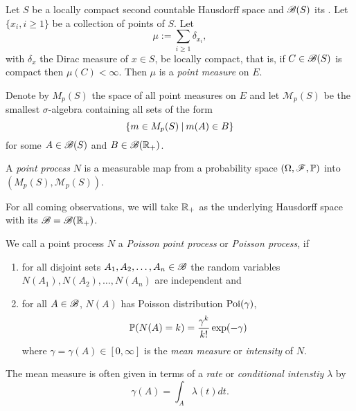 \begin{definition} \label{D: point process}
	Let $S$ be a locally compact second countable Hausdorff space
	and $\mathscr{B}(S)$ its \Bosi.
	Let $\{x_i, i \geq 1\}$ be a collection of points of $S$.
	Let
	\begin{equation}
		\mu := \sum_{i \geq 1} \delta_{x_i},
	\end{equation}
	with $\delta_x$ the Dirac measure of $x \in S$,
	be locally compact, that is, 
	if $C \in \mathscr{B}(S)$ is compact then $\mu(C) < \infty$.
	Then $\mu$ is a \emph{point measure} on $E$.
	
	Denote by $M_p(S)$ the space of all point measures on $E$
	and let $\mathscr{M}_p(S)$ be the smallest $\sigma$-algebra containing all sets of the form
	\begin{equation*}
		\{ m \in M_p(S) \: | \: m(A) \in B \}
	\end{equation*}
	for some $A \in \mathscr{B}(S)$ and $B \in \mathscr{B}(\mathbb{R}_+)$.
	
	A \emph{point process} $N$ is a measurable map from a probability space
	$(\Omega, \mathscr{F}, \mathbb{P})$ into $(M_p(S), \mathscr{M}_p(S))$.
\end{definition}

For all coming observations, we will take $\mathbb{R}_+$ as the underlying Hausdorff space with its \Bosi $\mathscr{B} = \mathscr{B}(\mathbb{R}_+)$.

\begin{definition} \label{D: poisson process}
	We call a point process $N$ a \emph{Poisson point process} or \emph{Poisson process},
	if
	\begin{enumerate}
		\item for all disjoint sets $A_1, A_2, \dots, A_n \in \mathscr{B}$
			the random variables $N(A_1), N(A_2), \dots, N(A_n)$ are independent and
		\item for all $A \in \mathscr{B}$, $N(A)$ has Poisson distribution $\operatorname*{Poi}(\gamma)$,
			\begin{equation*}
				\mathbb{P}(N(A) = k) = \frac{\gamma^k}{k!}\exp(-\gamma)
			\end{equation*}
			where $\gamma = \gamma(A) \in [0, \infty]$ is the \emph{mean measure} or \emph{intensity} of $N$.
	\end{enumerate}
	The mean measure is often given in terms of a \emph{rate} or \emph{conditional intenstiy} $\lambda$ by
	\begin{equation}
		\gamma(A) = \int_A \lambda(t)dt.
	\end{equation}	
\end{definition}

